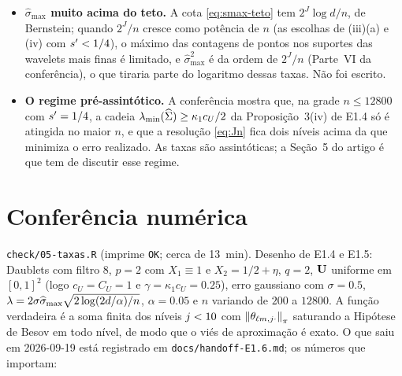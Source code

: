 \documentclass[11pt,a4paper]{article}
\newcommand{\lmin}{\lambda_{\min}}
\newcommand{\smax}{\widehat{\sigma}_{\max}}
\begin{document}
\begin{itemize}[nosep, leftmargin=*]
    $s < 1/2$ a contagem é justa em $t$. O que ela não dá: a taxa das
    componentes, que continua pedindo $\lmin(\Gramhat)$; e, em
    $\seff \le s/(2s+1)$, a taxa $(\log n/n)^{2s/(2s+1)}$, que nem o
    Corolário~\ref{cor:compressivel} alcança nesses pares.
  \item \textbf{$\smax$ muito acima do teto.} A cota \eqref{eq:smax-teto}
    tem $2^{J}\log d/n$, de Bernstein; quando $2^{J}/n$ cresce como potência
    de $n$ (as escolhas de (iii)(a) e (iv) com $s' < 1/4$), o máximo das
    contagens de pontos nos suportes das wavelets mais finas é limitado, e
    $\smax^{2}$ é da ordem de $2^{J}/n$ (Parte~VI da conferência), o que
    tiraria parte do logaritmo dessas taxas. Não foi escrito.
  \item \textbf{O regime pré-assintótico.} A conferência mostra que, na grade
    $n \le 12800$ com $s' = 1/4$, a cadeia
    $\lmin(\Gramhat) \ge \kappa_{1}c_{U}/2$ da Proposição~3(iv) de E1.4 só é
    atingida no maior $n$, e que a resolução \eqref{eq:Jn} fica dois níveis
    acima da que minimiza o erro realizado. As taxas são assintóticas; a
    Seção~5 do artigo é que tem de discutir esse regime.
\end{itemize}

\section{Conferência numérica}

\texttt{check/05-taxas.R} (imprime \texttt{OK}; cerca de 13~min). Desenho de
E1.4 e E1.5: Daublets com filtro 8, $p = 2$ com $X_{1}\equiv 1$ e
$X_{2} = 1/2+\eta$, $q = 2$, $\mathbf{U}$ uniforme em $[0,1]^{2}$ (logo
$c_{U} = C_{U} = 1$ e $\gamma = \kappa_{1}c_{U} = 0.25$), erro gaussiano com
$\sigma = 0.5$, $\pen = 2\sigma\smax\sqrt{2\log(2d/\alpha)/n}$, $\alpha = 0.05$
e $n$ variando de $200$ a $12800$. A função verdadeira é a soma finita dos
níveis $j < 10$ com $\left\lVert \theta_{\ell m,j\cdot} \right\rVert_{\pi}$ saturando a
Hipótese de Besov em todo nível, de modo que o viés de aproximação é exato.
O que saiu em 2026-09-19 está registrado em \texttt{docs/handoff-E1.6.md}; os
números que importam:
\end{document}
